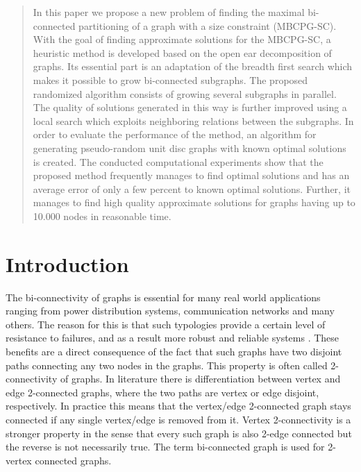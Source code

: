 \begin{abstract}
In this paper we propose a new problem of finding the maximal bi-connected partitioning of a graph with a size constraint (MBCPG-SC).  With the goal of finding approximate solutions for the MBCPG-SC, a heuristic method is developed based on the open ear decomposition of graphs. Its essential part is an adaptation of the breadth first search which makes it possible to grow bi-connected subgraphs. The proposed randomized algorithm consists of  growing several subgraphs in parallel. The quality of solutions generated in this way is further improved using a local search which exploits neighboring relations between the subgraphs. In order to evaluate the performance of the method, an algorithm for generating pseudo-random unit disc graphs with known optimal solutions is created. The conducted computational experiments show that the proposed  method  frequently manages to find optimal solutions and has an average error of  only a few percent to known optimal solutions.   Further, it manages to find high quality approximate solutions for graphs having up to 10.000 nodes in reasonable time.
\end{abstract}


\section{Introduction}

The bi-connectivity of graphs is essential for many real world applications ranging from power distribution systems, communication networks and many others. The reason for this is that such typologies provide a certain level of resistance to failures, and as a result more robust and reliable systems \citep{Zhang2009812,Moraes20133188,Goldschmidt199697,hu2010generalized}. These benefits are a direct consequence of the fact that such graphs have two disjoint paths connecting any two nodes in the graphs. This property is often called 2-connectivity of graphs. In literature there is differentiation between vertex  and edge 2-connected graphs, where the two paths are vertex  or edge disjoint, respectively. In practice this means that the vertex/edge 2-connected graph stays connected if any single vertex/edge is removed from it. Vertex 2-connectivity is a stronger property in the sense that every such graph is also 2-edge connected but the reverse is not necessarily true. The term bi-connected graph is used for 2-vertex connected graphs. 

